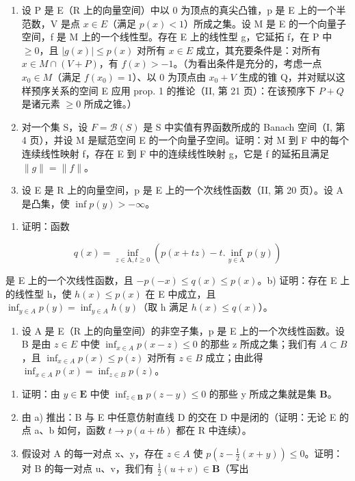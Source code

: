 \exercisegroup

\begin{enumerate}
\def\labelenumi{\arabic{enumi})}
\item
  设 P 是 E（R 上的向量空间）中以 0 为顶点的真尖凸锥，p 是 E 上的一个半范数，V 是点 \(x \in E\)（满足 \(p(x) < 1\)）所成之集。设 M 是 E 的一个向量子空间，f 是 M 上的一个线性型。存在 E 上的线性型 g，它延拓 f，在 P 中 \(\geqslant 0\)，且 \(|g(x)| \leqslant p(x)\) 对所有 \(x \in E\) 成立，其充要条件是：对所有 \(x \in M \cap (V + P)\)，有 \(f(x) > -1\)。（为看出条件是充分的，考虑一点 \(x_0 \in M\)（满足 \(f(x_0) = 1\)）、以 0 为顶点由 \(x_0 + V\) 生成的锥 Q，并对赋以这样预序关系的空间 E 应用 prop. 1 的推论（II, 第 21 页）：在该预序下 \(P + Q\) 是诸元素 \(\geqslant 0\) 所成之锥。）
\item
  对一个集 S，设 \(F = \mathcal{B}(S)\) 是 S 中实值有界函数所成的 Banach 空间（I, 第 4 页），并设 M 是赋范空间 E 的一个向量子空间。证明：对 M 到 F 中的每个连续线性映射 f，存在 E 到 F 中的连续线性映射 g，它是 f 的延拓且满足 \(\|g\| = \|f\|\)。
\item
  设 E 是 R 上的向量空间，p 是 E 上的一个次线性函数（II, 第 20 页）。设 A 是凸集，使 \(\inf p(y) > -\infty\)。
\end{enumerate}

\begin{enumerate}
\def\labelenumi{\alph{enumi})}
\tightlist
\item
  证明：函数
\end{enumerate}

\[
q (x) = \inf _ {z \in \mathrm{A}, t \geqslant 0} \left(p (x + t z) - t. \inf _ {y \in \mathrm{A}} p (y)\right)
\]

是 E 上的一个次线性函数，且 \(-p(-x) \leqslant q(x) \leqslant p(x)\)。b) 证明：存在 E 上的线性型 h，使 \(h(x) \leqslant p(x)\) 在 E 中成立，且 \(\inf_{y \in A} p(y) = \inf_{y \in A} h(y)\)（取 h 满足 \(h(x) \leqslant q(x)\)）。

\begin{enumerate}
\def\labelenumi{\arabic{enumi})}
\setcounter{enumi}{3}
\tightlist
\item
  设 A 是 E（R 上的向量空间）的非空子集，p 是 E 上的一个次线性函数。设 B 是由 \(z \in E\) 中使 \(\inf_{x \in A} p(x - z) \leqslant 0\) 的那些 z 所成之集；我们有 \(A \subset B\)，且 \(\inf_{x \in A} p(x) \leqslant p(z)\) 对所有 \(z \in B\) 成立；由此得 \(\inf_{x \in A} p(x) = \inf_{z \in B} p(z)\)。
\end{enumerate}


\begin{enumerate}
\def\labelenumi{\alph{enumi})}
\item
  证明：由 \(y \in \mathbf{E}\) 中使 \(\inf_{z \in \mathbf{B}} p(z - y) \leqslant 0\) 的那些 y 所成之集就是集 \(\mathbf{B}\)。
\item
  由 a) 推出：B 与 E 中任意仿射直线 D 的交在 D 中是闭的（证明：无论 E 的点 a、b 如何，函数 \(t \rightarrow p(a + tb)\) 都在 R 中连续）。
\item
  假设对 A 的每一对点 x、y，存在 \(z \in A\) 使 \(p(z - \frac{1}{2}(x + y)) \leqslant 0\)。证明：对 B 的每一对点 u、v，我们有 \(\frac{1}{2}(u + v) \in \mathbf{B}\)（写出
\end{enumerate}

